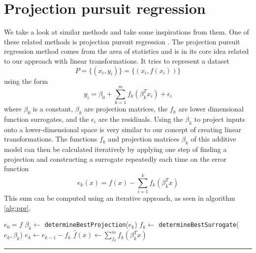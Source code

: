 \documentclass[
  a4paper,  %
  twoside,  %
  bibliography=totoc,
  headsepline,
  cleardoublepage=empty,
  parskip=half,
  draft=false
]{scrbook}
\newcommand{\delimit}{{\color{charcoal}\noindent\rule{\textwidth}{1pt}}}
\begin{document}
\section{Projection pursuit regression}

We take a look at similar methods and take some inspirations from them.
One of these related methods is projection pursuit regression \cite{}.
The projection pursuit regression method comes from the area of statistics and is in its core idea related to our approach with linear transformations.
It tries to represent a dataset
\begin{equation}
P=\{(x_i, y_i)\}=\{(x_i, f(x_i))\}
\end{equation}
using the form
\begin{equation}
y_i=\beta_0 + \sum_{k=1}^m f_k(\beta_k^T x_i) + \epsilon_i
\label{ppr}
\end{equation}
where $\beta_0$ is a constant, $\beta_k$ are projection matrices, the $f_k$ are lower dimensional function surrogates, and the $\epsilon_i$ are the residiuals.
Using the $\beta_k$ to project inputs onto a lower-dimensional space is very similar to our concept of creating linear transformations.
The functions $f_k$ and projection matrices $\beta_k$ of this additive model can then be calculated iteratively by applying one step of finding a projection and constructing a surrogate repeatedly each time on the error function
\begin{equation}
e_k(x)=f(x) - \sum_{i=1}^k f_k(\beta_k^T x)
\end{equation}
This sum can be computed using an iterative approach, as seen in algorithm \ref{alg:ppr}.

\newpage

\begin{mdframed}[style=algstyle,frametitle={\textbf{function} \texttt{projectionPursuitRegression}{$(f, k_{\text{max}})$}}]
\normalsize
\vspace{5.5mm}
\begin{algorithmic}[1]

    \State $e_0 = f$
    	\State $\beta_k \gets$ \texttt{determineBestProjection}($e_k$)
    	\State $f_k \gets$ \texttt{determineBestSurrogate}($e_k, \beta_k$)
    	\State $e_k \gets e_{k - 1} - f_k$
    \EndFor
    \State $\hat{f}(x) \gets \sum_{f_k}^m f_k(\beta_k^T x)$
    \State {}
\end{algorithmic}

\vspace{-1.5mm}
\delimit

	\label{alg:ppr}
\end{mdframed}
\end{document}
